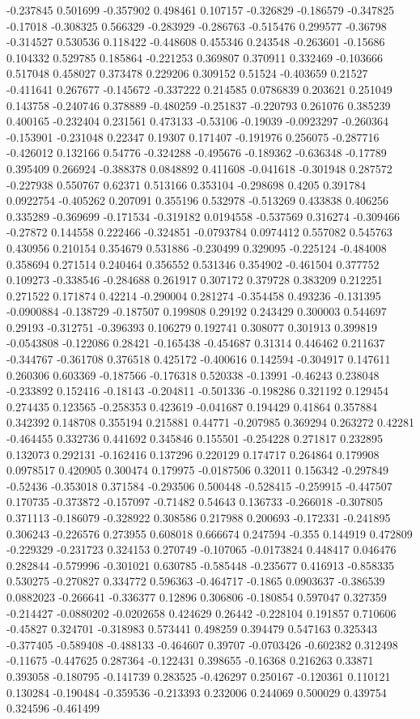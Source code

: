 -0.237845 0.501699 -0.357902 0.498461 0.107157 -0.326829 -0.186579 -0.347825 -0.17018 -0.308325 0.566329 -0.283929 -0.286763 -0.515476 0.299577 -0.36798 -0.314527 0.530536 0.118422 -0.448608 0.455346 0.243548 -0.263601 -0.15686 0.104332 0.529785 0.185864 -0.221253 0.369807 0.370911 0.332469 -0.103666 0.517048 0.458027 0.373478 0.229206 0.309152 0.51524 -0.403659 0.21527 -0.411641 0.267677 -0.145672 -0.337222 0.214585 0.0786839 0.203621 0.251049 0.143758 -0.240746 0.378889 -0.480259 -0.251837 -0.220793 0.261076 0.385239 0.400165 -0.232404 0.231561 0.473133 -0.53106 -0.19039 -0.0923297 -0.260364 -0.153901 -0.231048 0.22347 0.19307 0.171407 -0.191976 0.256075 -0.287716 -0.426012 0.132166 0.54776 -0.324288 -0.495676 -0.189362 -0.636348 -0.17789 0.395409 0.266924 -0.388378 0.0848892 0.411608 -0.041618 -0.301948 0.287572 -0.227938 0.550767 0.62371 0.513166 0.353104 -0.298698 0.4205 0.391784 0.0922754 -0.405262 0.207091 0.355196 0.532978 -0.513269 0.433838 0.406256 0.335289 -0.369699 -0.171534 -0.319182 0.0194558 -0.537569 0.316274 -0.309466 -0.27872 0.144558 0.222466 -0.324851 -0.0793784 0.0974412 0.557082 0.545763 0.430956 0.210154 0.354679 0.531886 -0.230499 0.329095 -0.225124 -0.484008 0.358694 0.271514 0.240464 0.356552 0.531346 0.354902 -0.461504 0.377752 0.109273 -0.338546 -0.284688 0.261917 0.307172 0.379728 0.383209 0.212251 0.271522 0.171874 0.42214 -0.290004 0.281274 -0.354458 0.493236 -0.131395 -0.0900884 -0.138729 -0.187507 0.199808 0.29192 0.243429 0.300003 0.544697 0.29193 -0.312751 -0.396393 0.106279 0.192741 0.308077 0.301913 0.399819 -0.0543808 -0.122086 0.28421 -0.165438 -0.454687 0.31314 0.446462 0.211637 -0.344767 -0.361708 0.376518 0.425172 -0.400616 0.142594 -0.304917 0.147611 0.260306 0.603369 -0.187566 -0.176318 0.520338 -0.13991 -0.46243 0.238048 -0.233892 0.152416 -0.18143 -0.204811 -0.501336 -0.198286 0.321192 0.129454 0.274435 0.123565 -0.258353 0.423619 -0.041687 0.194429 0.41864 0.357884 0.342392 0.148708 0.355194 0.215881 0.44771 -0.207985 0.369294 0.263272 0.42281 -0.464455 0.332736 0.441692 0.345846 0.155501 -0.254228 0.271817 0.232895 0.132073 0.292131 -0.162416 0.137296 0.220129 0.174717 0.264864 0.179908 0.0978517 0.420905 0.300474 0.179975 -0.0187506 0.32011 0.156342 -0.297849 -0.52436 -0.353018 0.371584 -0.293506 0.500448 -0.528415 -0.259915 -0.447507 0.170735 -0.373872 -0.157097 -0.71482 0.54643 0.136733 -0.266018 -0.307805 0.371113 -0.186079 -0.328922 0.308586 0.217988 0.200693 -0.172331 -0.241895 0.306243 -0.226576 0.273955 0.608018 0.666674 0.247594 -0.355 0.144919 0.472809 -0.229329 -0.231723 0.324153 0.270749 -0.107065 -0.0173824 0.448417 0.046476 0.282844 -0.579996 -0.301021 0.630785 -0.585448 -0.235677 0.416913 -0.858335 0.530275 -0.270827 0.334772 0.596363 -0.464717 -0.1865 0.0903637 -0.386539 0.0882023 -0.266641 -0.336377 0.12896 0.306806 -0.180854 0.597047 0.327359 -0.214427 -0.0880202 -0.0202658 0.424629 0.26442 -0.228104 0.191857 0.710606 -0.45827 0.324701 -0.318983 0.573441 0.498259 0.394479 0.547163 0.325343 -0.377405 -0.589408 -0.488133 -0.464607 0.39707 -0.0703426 -0.602382 0.312498 -0.11675 -0.447625 0.287364 -0.122431 0.398655 -0.16368 0.216263 0.33871 0.393058 -0.180795 -0.141739 0.283525 -0.426297 0.250167 -0.120361 0.110121 0.130284 -0.190484 -0.359536 -0.213393 0.232006 0.244069 0.500029 0.439754 0.324596 -0.461499 